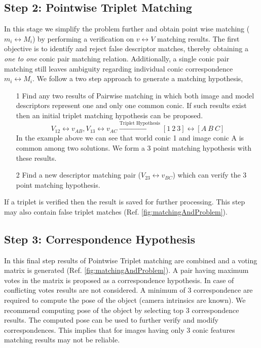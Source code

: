 \documentclass{bmvc2k}
\begin{document}
\subsection{Step 2: Pointwise Triplet Matching}
In this stage we simplify the problem further and obtain point wise matching ($ m_i \leftrightarrow M_i $) by performing a verification on $ v \leftrightarrow V $ matching results. 
The first objective is to identify and reject false descriptor matches, thereby obtaining a \textit{one to one} conic pair matching relation. Additionally, a single conic pair matching still leaves ambiguity regarding individual conic correspondence $ m_i \leftrightarrow M_i $. 
We follow a two step approach to generate a matching hypothesis,
\begin{enumerate}
\item[1] Find any two results of Pairwise matching in which both image and model descriptors represent one and only one common conic. If such results exist then an initial triplet matching hypothesis can be proposed.
\[
 V_{12} \leftrightarrow v_{AB},V_{13} \leftrightarrow v_{AC } \xrightarrow{\text{Triplet Hypothesis}} [1~2~3] \leftrightarrow [A~B~ C]
\]
In the example above we can see that world conic 1 and image conic A is common among two solutions. We form a 3 point matching hypothesis with these results. 
\item[2] Find a new descriptor matching pair ($ V_{23} \leftrightarrow v_{BC}$) which can verify the 3 point matching hypothesis.
\end{enumerate}
If a triplet is verified then the result is saved for further processing. This step may also contain false triplet matches (Ref. \ref{fig:matchingAndProblem}). 

\subsection{Step 3: Correspondence Hypothesis }
\label{subSec:CHypo}
In this final step results of Pointwise Triplet matching are combined and a voting matrix is generated (Ref. \ref{fig:matchingAndProblem}). A pair having maximum votes in the matrix is proposed as a correspondence hypothesis. In case of conflicting votes results are not considered. A minimum of 3 correspondence are required to compute the pose of the object \cite{lepetit_monocular_2005}(camera intrinsics are known). We recommend computing pose of the object by 
selecting top 3 correspondence results. The computed pose can be used to further verify and modify correspondences. This implies that for images having only 3 conic features matching results may not be reliable. 
\end{document}
